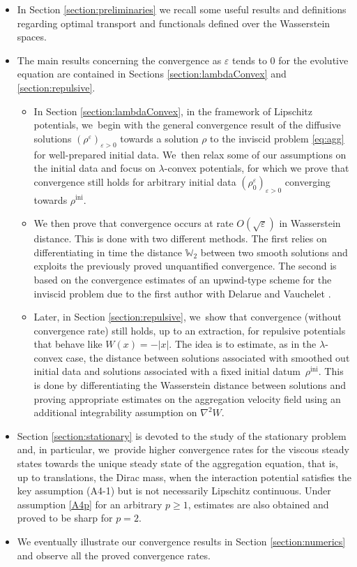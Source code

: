 \documentclass[JEP,XML,SOM,Unicode, NoFloatCountersInSection,published]{cedram}
\newcommand{\ini}{\mathrm{ini}}
\def\WW{\mathbb{W}}
\def\eps{\varepsilon}
\theoremstyle{plain}
\theoremstyle{definition}
\begin{document}
\begin{itemize}
\item
In Section \ref{section:preliminaries} we recall some useful results and definitions regarding optimal transport and functionals defined over the Wasserstein spaces.

\item
The main results concerning the convergence as $\eps$ tends to 0 for the evolutive equation are contained in Sections \ref{section:lambdaConvex} and \ref{section:repulsive}.

\begin{itemize}
\item In Section \ref{section:lambdaConvex}, in the framework of Lipschitz potentials, we~begin with the general convergence result of the diffusive solutions $(\rho^\eps)_{\eps>0}$ towards a solution $\rho$ to the inviscid problem \eqref{eq:agg} for well-prepared initial data. We~then relax some of our assumptions on the initial data and focus on $\lambda$-convex potentials, for which we prove that convergence still holds for arbitrary initial data $(\rho_0^\eps)_{\eps >0}$ converging towards $\rho^{\ini}$. \item We then prove that convergence occurs at rate $O(\sqrt{\eps})$ in Wasserstein distance. This is done with two different methods. The first relies on differentiating in time the distance $\WW_2$ between two smooth solutions and exploits the previously proved unquantified convergence. The second is based on the convergence estimates of an upwind-type scheme for the inviscid problem due to the first author with Delarue and Vauchelet \cite{dlv17, dlv20}.

\item Later, in Section \ref{section:repulsive}, we~show that convergence (without convergence rate) still holds, up to an extraction, for repulsive potentials that behave like $W(x) = -|x|$. The idea is to estimate, as in the $\lambda$-convex case, the distance between solutions associated with smoothed out initial data and solutions associated with a fixed initial datum~$\rho^{\ini}$. This is done by differentiating the Wasserstein distance between solutions and proving appropriate estimates on the aggregation velocity field using an additional integrability assumption on $\nabla^2 W$.
\end{itemize}
\item
Section \ref{section:stationary} is devoted to the study of the stationary problem and, in particular, we~provide higher convergence rates for the viscous steady states towards the unique steady state of the aggregation equation, that is, up to translations, the Dirac mass, when the interaction potential satisfies the key assumption (A4-1) but is not necessarily Lipschitz continuous. Under assumption \eqref{A4p} for an arbitrary $p\geq 1$, estimates are also obtained and proved to be sharp for $p=2$.

\item
We eventually illustrate our convergence results in Section \ref{section:numerics} and observe all the proved convergence rates.
\end{itemize}
\end{document}
